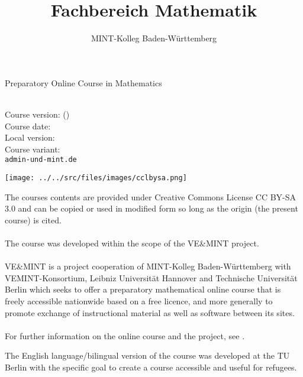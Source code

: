

\title{Fachbereich Mathematik}
\author{MINT-Kolleg Baden-W\"urttemberg}



\MSetSubject{\MINTMathematics}

\begin{framed}
\begin{center}
\LARGE
Preparatory Online Course in Mathematics\\
\large
\end{center}
\ \\
Course version: \MSignatureMain (\MSignatureVersion) \\
Course date: \MSignatureDate \\
Local version: \MSignatureLocalization \\ 
Course variant: \MSignatureVariant \\
\scriptsize \texttt{admin\@@ve-und-mint.de}
\end{framed}

\begin{center}
\texttt{[image: ../../src/files/images/cclbysa.png]}
\end{center}
The courses contents are provided under Creative Commons License CC BY-SA 3.0 and can be
copied or used in modified form so long as the origin (the present course) is cited.
\ \\ \ \\
The course was developed within the scope of the VE\&MINT project.
\ \\ \ \\
VE\&MINT is a project cooperation of MINT-Kolleg Baden-Württemberg
with VEMINT-Konsortium, Leibniz Universität Hannover and Technische Universität Berlin which seeks to
offer a preparatory mathematical online course that is freely accessible nationwide based on a free licence,
and more generally to promote exchange of instructional material as well as software between its sites.
\ \\ \ \\
For further information on the online course and the project, see .

The English language/bilingual version of the course was developed at the TU Berlin with the specific goal to create a course
accessible and useful for refugees.



\tableofcontents



\MPrintIndex



